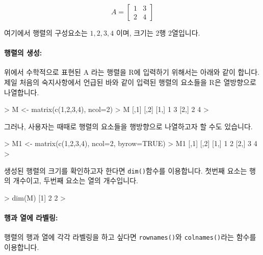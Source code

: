 \documentclass{report}
\begin{document}
\begin{equation}
A = 
\begin{bmatrix}
1 & 3 \\
2 & 4 
\end{bmatrix}
\end{equation}

여기에서 행렬의 구성요소는 $1,2,3,4$ 이며, 크기는 2행 2열입니다. 

\paragraph{행렬의 생성:} 위에서 수학적으로 표현된 A 라는 행렬을 R에 입력하기 위해서는 아래와 같이 합니다. 
제일 처음의 숙지사항에서 언급된 바와 같이 입력된 행렬의 요소들을 R은 열방향으로 나열합니다. 

\begin{Schunk}
\begin{Soutput}
> M <- matrix(c(1,2,3,4), ncol=2)
> M
     [,1] [,2]
[1,]    1    3
[2,]    2    4
>
\end{Soutput}
\end{Schunk}

그러나, 사용자는 때때로 행렬의 요소들을 행방향으로 나열하고자 할 수도 있습니다. 

\begin{Schunk}
\begin{Soutput}
> M1 <- matrix(c(1,2,3,4), ncol=2, byrow=TRUE)
> M1
     [,1] [,2]
[1,]    1    2
[2,]    3    4
>
\end{Soutput}
\end{Schunk}

생성된 행렬의 크기를 확인하고자 한다면 \texttt{dim()}함수를 이용합니다.
첫번째 요소는 행의 개수이고, 두번째 요소는 열의 개수입니다. 

\begin{Schunk}
\begin{Soutput}
> dim(M)
[1] 2 2
>
\end{Soutput}
\end{Schunk}

\paragraph{행과 열에 라벨링:}  행렬의 행과 열에 각각 라벨링을 하고 싶다면 \texttt{rownames()}와 \texttt{colnames()}라는 함수를 이용합니다.
\end{document}
